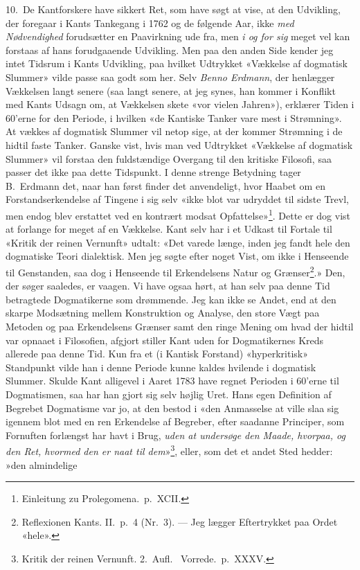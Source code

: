 \documentclass[12pt,a4paper]{article}
\newcommand{\apage}[1]{\marginnote{\footnotesize\textit{[#1]}}}
\begin{document}
10.\ De Kantforskere have sikkert Ret, som have søgt at vise, at den
Udvikling, der foregaar i Kants Tankegang i 1762 og de følgende Aar, ikke
\emph{med Nødvendighed} forudsætter en Paavirkning ude fra, men \emph{i og for sig}
meget vel kan forstaas af hans forudgaaende Udvikling. Men paa den anden
Side kender jeg intet Tidsrum i Kants Udvikling, paa hvilket Udtrykket
«Vækkelse af dogmatisk Slummer» vilde passe saa godt som her. Selv \emph{Benno
Erdmann}, der henlægger Vækkelsen langt senere (saa langt senere, at jeg
synes, han kommer i Konflikt med Kants Udsagn om, at Vækkelsen skete «vor
vielen Jahren»), erklærer Tiden i 60'erne for den Periode, i hvilken «de
Kantiske Tanker vare mest i Strømning». At vækkes af dogmatisk Slummer
vil netop sige, at der kommer Strømning i de hidtil faste Tanker. Ganske
vist, hvis man ved Udtrykket «Vækkelse af dogmatisk Slummer» vil forstaa
den fuldstændige Overgang til den kritiske Filosofi, \apage{23} saa passer det ikke
paa dette Tidspunkt. I denne strenge Betydning tager B.\ Erdmann det,
naar han først finder det anvendeligt, hvor Haabet om en
Forstandserkendelse af Tingene i sig selv «ikke blot var udryddet til
sidste Trevl, men endog blev erstattet ved en kontrært modsat
Opfattelse»\footnote{Einleitung zu Prolegomena.\ p.\ XCII.}.
Dette er dog vist at forlange for meget af en Vækkelse. Kant selv har i
et Udkast til Fortale til «Kritik der reinen Vernunft» udtalt: «Det
varede længe, inden jeg fandt hele den dogmatiske Teori dialektisk.
Men jeg søgte efter noget Vist, om ikke i Henseende til Genstanden, saa
dog i Henseende til Erkendelsens Natur og
Grænser\footnote{Reflexionen Kants. II.\ p.\ 4 (Nr.\ 3). ---
Jeg lægger Eftertrykket paa Ordet «hele».}.» Den, der søger saaledes, er
vaagen. Vi have ogsaa hørt, at han selv paa denne Tid betragtede
Dogmatikerne som drømmende. Jeg kan ikke se Andet, end at den skarpe
Modsætning mellem Konstruktion og Analyse, den store Vægt paa Metoden og
paa Erkendelsens Grænser samt den ringe Mening om hvad der hidtil var
opnaaet i Filosofien, afgjort stiller Kant uden for Dogmatikernes Kreds
allerede paa denne Tid. Kun fra et (i Kantisk Forstand) «hyperkritisk»
Standpunkt vilde han i denne Periode kunne kaldes hvilende i dogmatisk
Slummer. Skulde Kant alligevel i Aaret 1783 have regnet Perioden i
60'erne til Dogmatismen, saa har han gjort sig selv højlig Uret. Hans
egen Definition af Begrebet Dogmatisme var jo, at den bestod i «den
Anmasselse at ville slaa sig igennem blot med en ren Erkendelse af
Begreber, efter saadanne Principer, som Fornuften forlængst har havt i
Brug, \emph{uden at undersøge den Maade, hvorpaa, og den Ret, hvormed den er
naat til dem}»\footnote{Kritik der reinen Vernunft. 2.\ Aufl.\
Vorrede.\ p.\ XXXV.}, eller, som det et andet Sted hedder: »den almindelige
\end{document}
